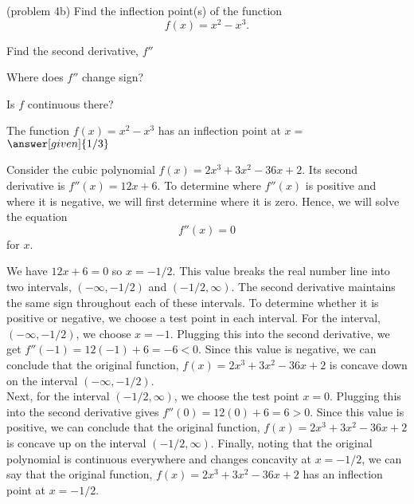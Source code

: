 \documentclass{ximera}
\begin{document}
\begin{problem}(problem 4b)
  Find the inflection point(s) of the function
  \[
     f(x) = x^2 - x^3.
  \]
  
    \begin{hint}
      Find the second derivative, $f''$
    \end{hint}
    \begin{hint}
      Where does $f''$ change sign?
    \end{hint}
    \begin{hint}
      Is $f$ continuous there?
    \end{hint}    
		The function $f(x) = x^2 - x^3$ has an inflection point at $x =$
		 $\answer[given]{1/3}$
		
\end{problem}


\begin{example}[example 5]
Consider the cubic polynomial $f(x) = 2x^3 + 3x^2 - 36x +2$.  Its second derivative is 
$f''(x) = 12x + 6$.  To determine where $f''(x)$ is positive and where it is negative, 
we will first determine where it is zero. Hence, we will solve the equation
\[f''(x) = 0\]
for $x$.

We have $12x + 6 = 0$ so $x = -1/2$.
This value breaks the real number line into two intervals, $(-\infty, -1/2)$ and $(-1/2, \infty)$.
The second derivative maintains the same sign throughout each of these intervals.  
To determine whether it is positive or negative, we choose a test point in each interval.
For the interval, $(-\infty, -1/2)$, we choose $x = -1$.  Plugging this into the second derivative, we get
$f''(-1) = 12(-1) + 6 = -6 < 0$.  Since this value is negative, we can conclude that the original function,
$f(x) = 2x^3 + 3x^2 - 36x + 2$ is concave down on the interval $(-\infty, -1/2)$. \\

Next, for the interval $(-1/2, \infty)$, we choose the test point 
$x = 0$.  Plugging this into the second derivative gives $f''(0) = 12(0) + 6 = 6 > 0$.
Since this value is positive, we can conclude that the original function,
$f(x) = 2x^3 + 3x^2 - 36x + 2$ is concave up on the interval $(-1/2, \infty)$.
Finally, noting that the original polynomial is continuous everywhere and changes concavity at $x = -1/2$, we can say that
the original function, 
$f(x) = 2x^3 + 3x^2 - 36x + 2$ has an inflection point at $x = -1/2$.
\end{example}
\end{document}
